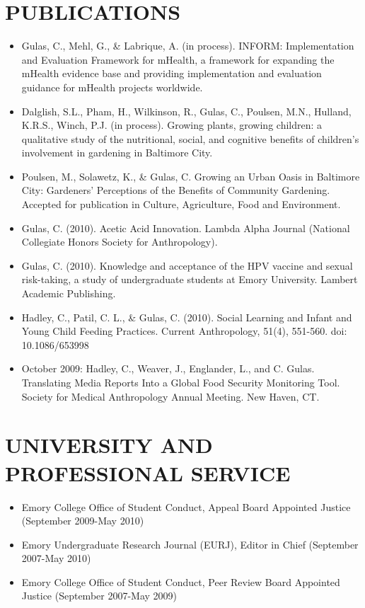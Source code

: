 \documentclass{res}
\begin{document}
\begin{resume}
\section{PUBLICATIONS}
\begin{itemize} \itemsep -2pt
	\item Gulas, C., Mehl, G., & Labrique, A.  (in process).  INFORM: Implementation and Evaluation Framework for mHealth, a framework for expanding the mHealth evidence base and providing implementation and evaluation guidance for mHealth projects worldwide.
    \item Dalglish, S.L., Pham, H., Wilkinson, R., Gulas, C., Poulsen, M.N., Hulland, K.R.S., Winch, P.J. (in process). Growing plants, growing children: a qualitative study of the nutritional, social, and cognitive benefits of children’s involvement in gardening in Baltimore City.
    \item Poulsen, M., Solawetz, K., & Gulas, C. Growing an Urban Oasis in Baltimore City: Gardeners’ Perceptions of the Benefits of Community Gardening.  Accepted for publication in Culture, Agriculture, Food and Environment.
    \item Gulas, C.  (2010).  Acetic Acid Innovation.  Lambda Alpha Journal (National Collegiate Honors Society for Anthropology).
    \item Gulas, C.  (2010).  Knowledge and acceptance of the HPV vaccine and sexual risk-taking, a study of undergraduate students at Emory University.  Lambert Academic Publishing. 
    \item Hadley, C., Patil, C. L., & Gulas, C. (2010). Social Learning and Infant and Young Child Feeding Practices. Current Anthropology, 51(4), 551-560. doi: 10.1086/653998
    \item October 2009: Hadley, C., Weaver, J., Englander, L., and C. Gulas. Translating Media Reports Into a Global Food Security Monitoring Tool. Society for Medical Anthropology Annual Meeting. New Haven, CT.
\end{itemize}

\section{UNIVERSITY AND PROFESSIONAL SERVICE}
\begin{itemize} \itemsep -2pt
	\item Emory College Office of Student Conduct, Appeal Board Appointed Justice (September 2009-May 2010)
    \item Emory Undergraduate Research Journal (EURJ), Editor in Chief (September 2007-May 2010)
    \item Emory College Office of Student Conduct, Peer Review Board Appointed Justice (September 2007-May 2009)
\end{itemize}


\end{resume}
\end{document}
